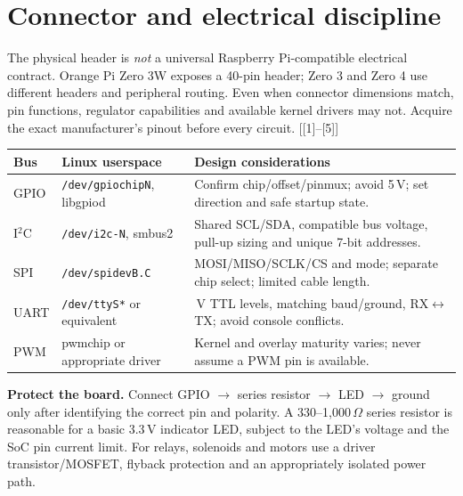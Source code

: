 \documentclass[10pt,oneside,openany]{report}
\newcommand{\code}[1]{\texttt{#1}}
\newcommand{\smallref}[1]{{\sffamily\scriptsize\color{slate}[#1]}}
\begin{document}
\section{Connector and electrical discipline}
The physical header is \emph{not} a universal Raspberry Pi-compatible electrical contract. Orange Pi Zero 3W exposes a 40-pin header; Zero 3 and Zero 4 use different headers and peripheral routing. Even when connector dimensions match, pin functions, regulator capabilities and available kernel drivers may not. Acquire the exact manufacturer's pinout before every circuit. \smallref{[1]--[5]}
\begin{center}\small\begin{tabularx}{\textwidth}{@{}>{\raggedright\arraybackslash}p{1.2cm}>{\raggedright\arraybackslash}p{3.1cm}>{\raggedright\arraybackslash}X@{}}\toprule
\textbf{Bus} & \textbf{Linux userspace} & \textbf{Design considerations}\\\midrule
GPIO & \code{/dev/gpiochipN}, libgpiod & Confirm chip/offset/pinmux; avoid 5\,V; set direction and safe startup state.\\
I\(^{2}\)C & \code{/dev/i2c-N}, smbus2 & Shared SCL/SDA, compatible bus voltage, pull-up sizing and unique 7-bit addresses.\\
SPI & \code{/dev/spidevB.C} & MOSI/MISO/SCLK/CS and mode; separate chip select; limited cable length.\\
UART & \code{/dev/ttyS*} or equivalent & 3.3\,V TTL levels, matching baud/ground, RX\(\leftrightarrow\)TX; avoid console conflicts.\\
PWM & pwmchip or appropriate driver & Kernel and overlay maturity varies; never assume a PWM pin is available.\\\bottomrule\end{tabularx}\end{center}
\begin{cautionbox}
\textbf{Protect the board.} Connect GPIO \(\to\) series resistor \(\to\) LED \(\to\) ground only after identifying the correct pin and polarity. A 330--1,000\,\(\Omega\) series resistor is reasonable for a basic 3.3\,V indicator LED, subject to the LED's voltage and the SoC pin current limit. For relays, solenoids and motors use a driver transistor/MOSFET, flyback protection and an appropriately isolated power path.
\end{cautionbox}
\end{document}
